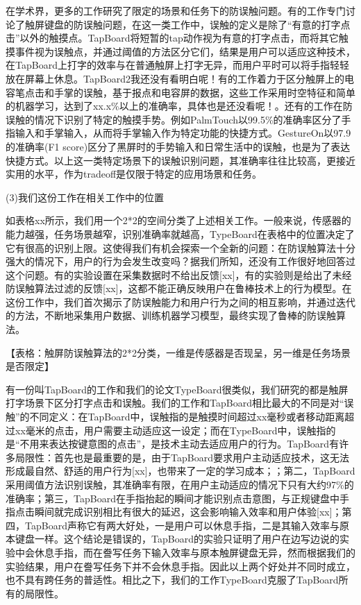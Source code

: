 在学术界，更多的工作研究了限定的场景和任务下的防误触问题。有的工作专门讨论了触屏键盘的防误触问题\cite{2013-TapBoard,2016-TapBoard2}，在这一类工作中，误触的定义是除了“有意的打字点击”以外的触摸点。TapBoard\cite{2013-TapBoard}将短暂的tap动作视为有意的打字点击，而将其它触摸事件视为误触点，并通过阈值的方法区分它们，结果是用户可以适应这种技术，在TapBoard上打字的效率与在普通触屏上打字无异，而用户平时可以将手指轻轻放在屏幕上休息。TapBoard2\cite{2016-TapBoard2}我还没有看明白呢！有的工作着力于区分触屏上的电容笔点击和手掌的误触，基于报点和电容屏的数据，这些工作采用时空特征和简单的机器学习，达到了xx.x\%以上的准确率，具体也是还没看呢！\cite{2013-PalmInput,2014-PenUnint,2014-PalmRejection}。还有的工作在防误触的情况下识别了特定的触摸手势。例如PalmTouch\cite{2018-PalmTouch}以99.5\%的准确率区分了手指输入和手掌输入，从而将手掌输入作为特定功能的快捷方式。GestureOn\cite{2015-GestureOn}以97.9的准确率(F1 score)区分了黑屏时的手势输入和日常生活中的误触，也是为了表达快捷方式。以上这一类特定场景下的误触识别问题，其准确率往往比较高，更接近实用的水平，作为tradeoff是仅限于特定的应用场景和任务。

(3)我们这份工作在相关工作中的位置

如表格xx所示，我们用一个2*2的空间分类了上述相关工作。一般来说，传感器的能力越强，任务场景越窄，识别准确率就越高，TypeBoard在表格中的位置决定了它有很高的识别上限。这使得我们有机会探索一个全新的问题：在防误触算法十分强大的情况下，用户的行为会发生改变吗？据我们所知，还没有工作很好地回答过这个问题。有的实验设置在采集数据时不给出反馈[xx]，有的实验则是给出了未经防误触算法过滤的反馈[xx]，这都不能正确反映用户在鲁棒技术上的行为模型。在这份工作中，我们首次揭示了防误触能力和用户行为之间的相互影响，并通过迭代的方法，不断地采集用户数据、训练机器学习模型，最终实现了鲁棒的防误触算法。

【表格：触屏防误触算法的2*2分类，一维是传感器是否现呈，另一维是任务场景是否限定】

有一份叫TapBoard的工作和我们的论文TypeBoard很类似\cite{2013-TapBoard}，我们研究的都是触屏打字场景下区分打字点击和误触。我们的工作和TapBoard相比最大的不同是对“误触”的不同定义：在TapBoard中，误触指的是触摸时间超过xx毫秒或者移动距离超过xx毫米的点击，用户需要主动适应这一设定；而在TypeBoard中，误触指的是“不用来表达按键意图的点击”，是技术主动去适应用户的行为。TapBoard有许多局限性：首先也是最重要的是，由于TapBoard要求用户主动适应技术，这无法形成最自然、舒适的用户行为[xx]，也带来了一定的学习成本；；第二，TapBoard采用阈值方法识别误触，其准确率有限，在用户主动适应的情况下只有大约97\%的准确率；第三，TapBoard在手指抬起的瞬间才能识别点击意图，与正规键盘中手指点击瞬间就完成识别相比有很大的延迟，这会影响输入效率和用户体验[xx]；第四，TapBoard声称它有两大好处，一是用户可以休息手指，二是其输入效率与原本键盘一样。这个结论是错误的，TapBoard的实验只证明了用户在边写边说的实验中会休息手指，而在誊写任务下输入效率与原本触屏键盘无异，然而根据我们的实验结果，用户在誊写任务下并不会休息手指。因此以上两个好处并不同时成立，也不具有跨任务的普适性。相比之下，我们的工作TypeBoard克服了TapBoard所有的局限性。

